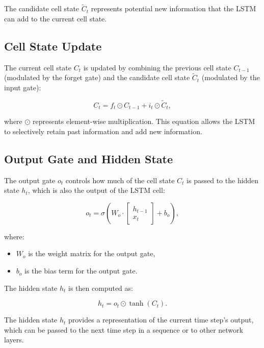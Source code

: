 \documentclass{article}
\begin{document}
The candidate cell state \( \tilde{C}_t \) represents potential new information that the LSTM can add to the current cell state.

\subsection{Cell State Update}
The current cell state \( C_t \) is updated by combining the previous cell state \( C_{t-1} \) (modulated by the forget gate) and the candidate cell state \( \tilde{C}_t \) (modulated by the input gate):

\begin{equation}
    C_t = f_t \odot C_{t-1} + i_t \odot \tilde{C}_t,
\end{equation}

where \( \odot \) represents element-wise multiplication. This equation allows the LSTM to selectively retain past information and add new information.

\subsection{Output Gate and Hidden State}
The output gate \( o_t \) controls how much of the cell state \( C_t \) is passed to the hidden state \( h_t \), which is also the output of the LSTM cell:

\begin{equation}
    o_t = \sigma \left( W_o \cdot \begin{bmatrix} h_{t-1} \\ x_t \end{bmatrix} + b_o \right),
\end{equation}

where:
\begin{itemize}
    \item \( W_o \) is the weight matrix for the output gate,
    \item \( b_o \) is the bias term for the output gate.
\end{itemize}

The hidden state \( h_t \) is then computed as:

\begin{equation}
    h_t = o_t \odot \tanh(C_t).
\end{equation}

The hidden state \( h_t \) provides a representation of the current time step’s output, which can be passed to the next time step in a sequence or to other network layers.
\end{document}
